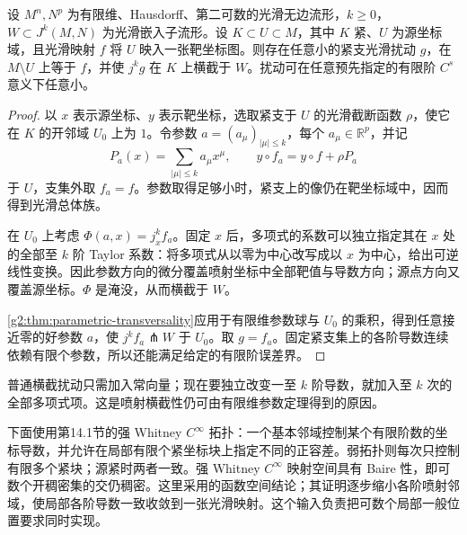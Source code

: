 \begin{lemma}\label{g2:lem:jet-polynomial-perturbation}
	设 \(M^n,N^p\) 为有限维、Hausdorff、第二可数的光滑无边流形，\(k\geq0\)，\(W\subset J^k(M,N)\) 为光滑嵌入子流形。设 \(K\subset U\subset M\)，其中 \(K\) 紧、\(U\) 为源坐标域，且光滑映射 \(f\) 将 \(U\) 映入一张靶坐标图。则存在任意小的紧支光滑扰动 \(g\)，在 \(M\setminus U\) 上等于 \(f\)，并使 \(j^kg\) 在 \(K\) 上横截于 \(W\)。扰动可在任意预先指定的有限阶 \(C^s\) 意义下任意小。
\end{lemma}
\begin{proof}
	以 \(x\) 表示源坐标、\(y\) 表示靶坐标，选取紧支于 \(U\) 的光滑截断函数 \(\rho\)，使它在 \(K\) 的开邻域 \(U_0\) 上为 \(1\)。令参数 \(a=(a_\mu)_{|\mu|\leq k}\)，每个 \(a_\mu\in\mathbb R^p\)，并记
	\[
		P_a(x)=\sum_{|\mu|\leq k}a_\mu x^\mu,\qquad
		y\circ f_a=y\circ f+\rho P_a
	\]
	于 \(U\)，支集外取 \(f_a=f\)。参数取得足够小时，紧支上的像仍在靶坐标域中，因而得到光滑总体族。

	在 \(U_0\) 上考虑 \(\Phi(a,x)=j_x^k f_a\)。固定 \(x\) 后，多项式的系数可以独立指定其在 \(x\) 处的全部至 \(k\) 阶 Taylor 系数：将多项式从以零为中心改写成以 \(x\) 为中心，给出可逆线性变换。因此参数方向的微分覆盖喷射坐标中全部靶值与导数方向；源点方向又覆盖源坐标。\(\Phi\) 是淹没，从而横截于 \(W\)。

	\cref{g2:thm:parametric-transversality}应用于有限维参数球与 \(U_0\) 的乘积，得到任意接近零的好参数 \(a\)，使 \(j^kf_a\pitchfork W\) 于 \(U_0\)。取 \(g=f_a\)。固定紧支集上的各阶导数连续依赖有限个参数，所以还能满足给定的有限阶误差界。
\end{proof}

普通横截扰动只需加入常向量；现在要独立改变一至 \(k\) 阶导数，就加入至 \(k\) 次的全部多项式项。这是喷射横截性仍可由有限维参数定理得到的原因。

\ProseParagraphBreak

下面使用第14.1节的强 Whitney \(C^\infty\) 拓扑：一个基本邻域控制某个有限阶数的坐标导数，并允许在局部有限个紧坐标块上指定不同的正容差。弱拓扑则每次只控制有限多个紧块；源紧时两者一致。强 Whitney \(C^\infty\) 映射空间具有 Baire 性，即可数个开稠密集的交仍稠密。这里采用\cite[第II章第3节，命题3.3，第44—46页]{GolubitskyGuillemin1973}的函数空间结论；其证明逐步缩小各阶喷射邻域，使局部各阶导数一致收敛到一张光滑映射。这个输入负责把可数个局部一般位置要求同时实现。

